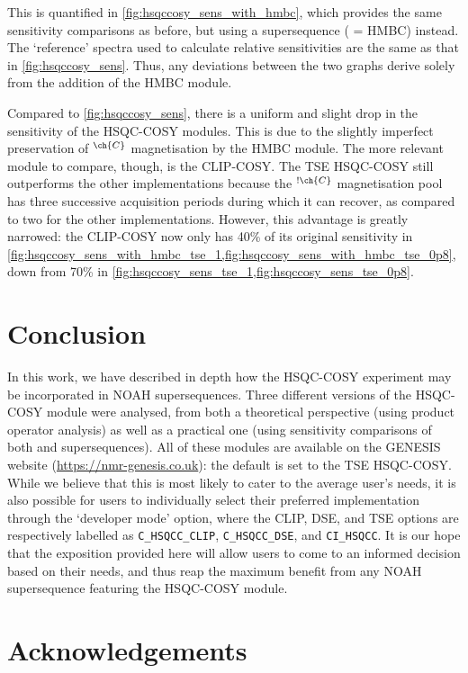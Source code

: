 \documentclass[a4paper,12pt]{article}
\newcommand{\magn}[1]{\ch{^1H}$^{\ch{#1}}$}
\newcommand{\magnnot}[1]{\ch{^1H}$^{!\ch{#1}}$}
\begin{document}
\begin{refsection}
This is quantified in \cref{fig:hsqccosy_sens_with_hmbc}, which provides the same sensitivity comparisons as before, but using a  supersequence ( = HMBC) instead.
The `reference' spectra used to calculate relative sensitivities are the same as that in \cref{fig:hsqccosy_sens}.
Thus, any deviations between the two graphs derive solely from the addition of the HMBC module.

Compared to \cref{fig:hsqccosy_sens}, there is a uniform and slight drop in the sensitivity of the HSQC-COSY modules.
This is due to the slightly imperfect preservation of \magn{C} magnetisation by the HMBC module.
The more relevant module to compare, though, is the CLIP-COSY.
The TSE HSQC-COSY still outperforms the other implementations because the \magnnot{C} magnetisation pool has three successive acquisition periods during which it can recover, as compared to two for the other implementations.
However, this advantage is greatly narrowed: the CLIP-COSY now only has 40\% of its original sensitivity in \cref{fig:hsqccosy_sens_with_hmbc_tse_1,fig:hsqccosy_sens_with_hmbc_tse_0p8}, down from 70\% in \cref{fig:hsqccosy_sens_tse_1,fig:hsqccosy_sens_tse_0p8}.

\section{Conclusion}

In this work, we have described in depth how the HSQC-COSY experiment may be incorporated in NOAH supersequences.
Three different versions of the HSQC-COSY module were analysed, from both a theoretical perspective (using product operator analysis) as well as a practical one (using sensitivity comparisons of both  and  supersequences).
All of these modules are available on the GENESIS website (\url{https://nmr-genesis.co.uk}): the default is set to the TSE HSQC-COSY.
While we believe that this is most likely to cater to the average user's needs, it is also possible for users to individually select their preferred implementation through the `developer mode' option, where the CLIP, DSE, and TSE options are respectively labelled as \texttt{C\_HSQCC\_CLIP}, \texttt{C\_HSQCC\_DSE}, and \texttt{CI\_HSQCC}.
It is our hope that the exposition provided here will allow users to come to an informed decision based on their needs, and thus reap the maximum benefit from any NOAH supersequence featuring the HSQC-COSY module.

\section*{Acknowledgements}


\end{refsection}
\end{document}
